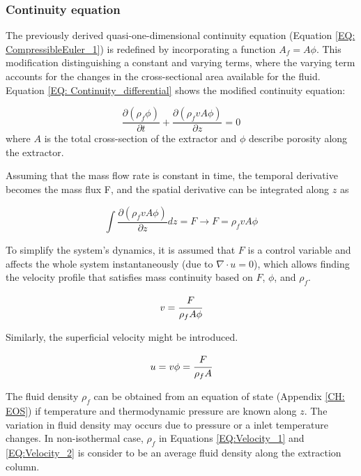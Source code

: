 \documentclass[../Article_Model_Parameters.tex]{subfiles}
\begin{document}
	
	\subsubsection{Continuity equation} \label{CH: Continuity}
	
	The previously derived quasi-one-dimensional continuity equation (Equation \ref{EQ: CompressibleEuler_1}) is redefined by incorporating a function $A_f = A\phi$. This modification distinguishing a constant and varying terms, where the varying term accounts for the changes in the cross-sectional area available for the fluid. Equation \ref{EQ: Continuity_differential} shows the modified continuity equation:
	
	{\footnotesize
		\begin{equation} \label{EQ: Continuity_differential}
			\frac{\partial (\rho_f \phi)}{\partial t} + \frac{\partial (\rho_f v A\phi)}{\partial z} = 0
		\end{equation}
	}
	where $A$ is the total cross-section of the extractor and $\phi$ describe porosity along the extractor.
	
	Assuming that the mass flow rate is constant in time, the temporal derivative becomes the mass flux F, and the spatial derivative can be integrated along $z$ as
	
	{\footnotesize
		\begin{equation}
			\int \frac{\partial (\rho_f v A \phi )}{\partial z} dz = F \rightarrow F=\rho_f v A\phi
		\end{equation}
	}
	
	To simplify the system's dynamics, it is assumed that $F$ is a control variable and affects the whole system instantaneously (due to $\nabla \cdot u = 0$), which allows finding the velocity profile that satisfies mass continuity based on $F$, $\phi$, and $\rho_f$.
	
	{\footnotesize
		\begin{equation} \label{EQ:Velocity_1}
			v = \cfrac{F}{\rho_f A\phi} 
		\end{equation}
	}
	
	Similarly, the superficial velocity might be introduced.
	
	{\footnotesize
		\begin{equation} \label{EQ:Velocity_2}
			u = v \phi = \cfrac{F}{\rho_f A }
		\end{equation}
	}
	
	The fluid density $\rho_f$ can be obtained from an equation of state (Appendix \ref{CH: EOS}) if temperature and thermodynamic pressure are known along $z$. The variation in fluid density may occurs due to pressure or a inlet temperature changes. In non-isothermal case, $\rho_f$ in Equations \ref{EQ:Velocity_1} and \ref{EQ:Velocity_2} is consider to be an average fluid density along the extraction column.
	
\end{document}
